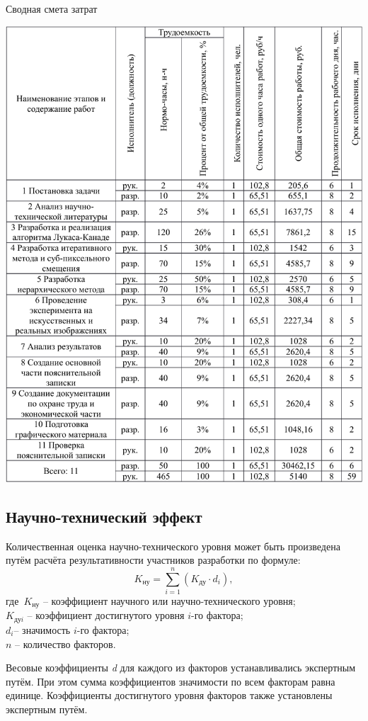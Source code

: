 \begin{table}[!ht]
\caption{Сводная смета затрат}
\centering
\includegraphics[page=9, width=1\linewidth]{econom_table.pdf}
\label{tab:eco_9}
\end{table}

\subsection{Научно-технический эффект}
Количественная оценка научно-технического уровня может быть произведена путём расчёта результативности участников разработки по формуле:
$$K_{\textit{ну}} = \sum_{i=1}^{n}(K_{\textit{ду}}\cdot d_{i}),$$
где\ $K_\textit{ну}$ – коэффициент научного или научно-технического уровня;\\$K_\textit{дуi}$ – коэффициент достигнутого уровня $\textit{i}{}$-го фактора;\\$d_{i}$– значимость $i$-го фактора;\\$\textit{n}$ – количество факторов.

Весовые коэффициенты \textit{d} для каждого из факторов устанавливались экспертным путём. При этом сумма коэффициентов значимости по всем факторам равна единице. Коэффициенты достигнутого уровня факторов также установлены экспертным путём.

